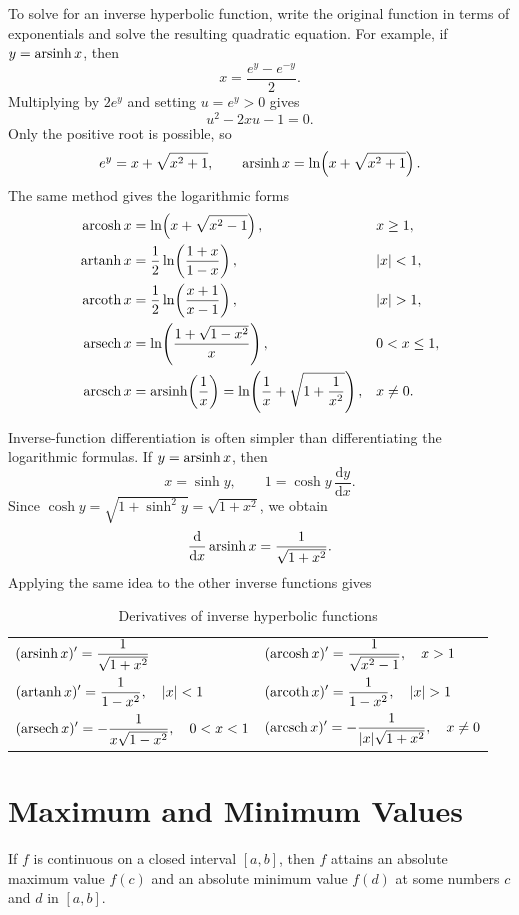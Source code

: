 To solve for an inverse hyperbolic function, write the original function
in terms of exponentials and solve the resulting quadratic equation.  For
example, if \(y=\operatorname{arsinh} x\), then
\[
    x=\frac{e^y-e^{-y}}{2}.
\]
Multiplying by \(2e^y\) and setting \(u=e^y>0\) gives
\[
    u^2-2xu-1=0.
\]
Only the positive root is possible, so
\[
    e^y=x+\sqrt{x^2+1},
    \qquad
    \operatorname{arsinh} x=\ln\!\left(x+\sqrt{x^2+1}\right).
\]
The same method gives the logarithmic forms
\begin{align*}
    \arcosh x&=\ln\!\left(x+\sqrt{x^2-1}\right), &&x\geq1,\\
    \artanh x&=\frac12\ln\!\left(\frac{1+x}{1-x}\right), &&|x|<1,\\
    \arcoth x&=\frac12\ln\!\left(\frac{x+1}{x-1}\right), &&|x|>1,\\
    \arsech x&=\ln\!\left(\frac{1+\sqrt{1-x^2}}{x}\right), &&0<x\leq1,\\
    \arcsch x&=\arsinh\!\left(\frac1x\right)
        =\ln\!\left(\frac1x+\sqrt{1+\frac1{x^2}}\right), &&x\neq0.
\end{align*}

Inverse-function differentiation is often simpler than differentiating
the logarithmic formulas.  If \(y=\operatorname{arsinh} x\), then
\[
    x=\sinh y,
    \qquad
    1=\cosh y\,\frac{\mathrm{d}y}{\mathrm{d}x}.
\]
Since \(\cosh y=\sqrt{1+\sinh^2y}=\sqrt{1+x^2}\), we obtain
\[
    \frac{\mathrm{d}}{\mathrm{d}x}\operatorname{arsinh} x
    =\frac{1}{\sqrt{1+x^2}}.
\]
Applying the same idea to the other inverse functions gives
\begin{table}[H]
    \centering
    \small
    \begin{tabular}{ll}
        \toprule
        \(\displaystyle (\operatorname{arsinh} x)'=\frac{1}{\sqrt{1+x^2}}\)
            & \(\displaystyle (\operatorname{arcosh} x)'=\frac{1}{\sqrt{x^2-1}},\quad x>1\) \\
        \(\displaystyle (\operatorname{artanh} x)'=\frac{1}{1-x^2},\quad |x|<1\)
            & \(\displaystyle (\arcoth x)'=\frac{1}{1-x^2},\quad |x|>1\) \\
        \(\displaystyle (\operatorname{arsech} x)'=-\frac{1}{x\sqrt{1-x^2}},\quad 0<x<1\)
            & \(\displaystyle (\operatorname{arcsch} x)'=-\frac{1}{|x|\sqrt{1+x^2}},\quad x\neq0\) \\
        \bottomrule
    \end{tabular}
    \caption{Derivatives of inverse hyperbolic functions}
    \label{tab:inverse-hyperbolic-derivatives}
\end{table}

\section{Maximum and Minimum Values}
\begin{theorem}
    If \(f\) is continuous on a closed interval \([a, b]\), then \(f\) attains an absolute maximum value \(f(c)\) and an absolute minimum value \(f(d)\) at some numbers \(c\) and \(d\) in \([a, b]\).        
\end{theorem}

